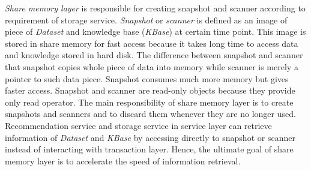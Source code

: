 \documentclass[a4paper,twoside]{article}
\begin{document}
\textit{Share memory layer} is responsible for creating snapshot and scanner according to requirement of storage service. \textit{Snapshot} or \textit{scanner} is defined as an image of piece of \textit{Dataset} and knowledge base (\textit{KBase}) at certain time point. This image is stored in share memory for fast access because it takes long time to access data and knowledge stored in hard disk. The difference between snapshot and scanner that snapshot copies whole piece of data into memory while scanner is merely a pointer to such data piece. Snapshot consumes much more memory but gives faster access. Snapshot and scanner are read-only objects because they provide only read operator. The main responsibility of share memory layer is to create snapshots and scanners and to discard them whenever they are no longer used. Recommendation service and storage service in service layer can retrieve information of \textit{Dataset} and \textit{KBase} by accessing directly to snapshot or scanner instead of interacting with transaction layer. Hence, the ultimate goal of share memory layer is to accelerate the speed of information retrieval.
\end{document}
